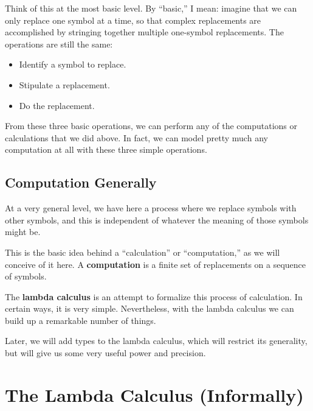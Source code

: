 \documentclass{book}
\numberwithin{equation}{chapter}
\newcommand{\vocab}{\textbf}
\begin{document}
\noindent
Think of this at the most basic level. By ``basic,'' I mean: imagine that we can only replace one symbol at a time, so that complex replacements are accomplished by stringing together multiple one-symbol replacements. The operations are still the same:

\begin{itemize}
\item{Identify a symbol to replace.}
\item{Stipulate a replacement.}
\item{Do the replacement.}
\end{itemize}

\noindent
From these three basic operations, we can perform any of the computations or calculations that we did above. In fact, we can model pretty much any computation at all with these three simple operations.


\section{Computation Generally}

At a very general level, we have here a process where we replace symbols with other symbols, and this is independent of whatever the meaning of those symbols might be.

This is the basic idea behind a ``calculation'' or ``computation,'' as we will conceive of it here. A \vocab{computation} is a finite set of replacements on a sequence of symbols.

The \vocab{lambda calculus} is an attempt to formalize this process of calculation. In certain ways, it is very simple. Nevertheless, with the lambda calculus we can build up a remarkable number of things. 

Later, we will add types to the lambda calculus, which will restrict its generality, but will give us some very useful power and precision.


\chapter{The Lambda Calculus (Informally)}
\end{document}
